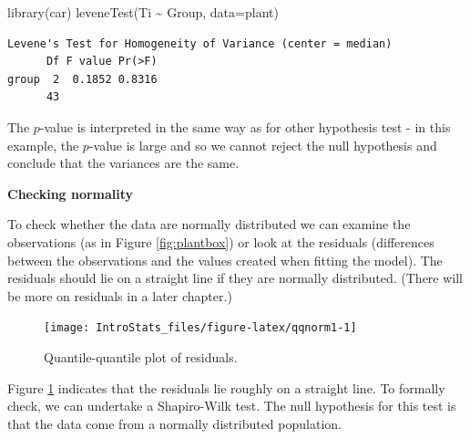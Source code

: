 \documentclass[
  oneside]{krantz}
\newenvironment{Shaded}{\begin{snugshade}}{\end{snugshade}}
\newcommand{\AttributeTok}[1]{\textcolor[rgb]{0.77,0.63,0.00}{#1}}
\newcommand{\CommentTok}[1]{\textcolor[rgb]{0.56,0.35,0.01}{\textit{#1}}}
\newcommand{\FunctionTok}[1]{\textcolor[rgb]{0.00,0.00,0.00}{#1}}
\newcommand{\NormalTok}[1]{#1}
\newcommand{\SpecialCharTok}[1]{\textcolor[rgb]{0.00,0.00,0.00}{#1}}
\begin{document}
\begin{Shaded}
\begin{Highlighting}[]
\FunctionTok{library}\NormalTok{(car)}
\FunctionTok{leveneTest}\NormalTok{(Ti }\SpecialCharTok{\textasciitilde{}}\NormalTok{ Group, }\AttributeTok{data=}\NormalTok{plant)}
\end{Highlighting}
\end{Shaded}

\begin{verbatim}
Levene's Test for Homogeneity of Variance (center = median)
      Df F value Pr(>F)
group  2  0.1852 0.8316
      43               
\end{verbatim}

The \(p\)-value is interpreted in the same way as for other hypothesis test - in this example, the \(p\)-value is large and so we cannot reject the null hypothesis and conclude that the variances are the same.

\textbf{Checking normality}

To check whether the data are normally distributed we can examine the observations (as in Figure \ref{fig:plantbox}) or look at the residuals (differences between the observations and the values created when fitting the model). The residuals should lie on a straight line if they are normally distributed. (There will be more on residuals in a later chapter.)

\begin{Shaded}
\end{Shaded}

\begin{figure}

{\centering \texttt{[image: IntroStats\_files/figure-latex/qqnorm1-1]} 

}

\caption{Quantile-quantile plot of residuals.}\label{fig:qqnorm1}
\end{figure}

Figure \ref{fig:qqnorm1} indicates that the residuals lie roughly on a straight line. To formally check, we can undertake a Shapiro-Wilk test. The null hypothesis for this test is that the data come from a normally distributed population.
\end{document}
